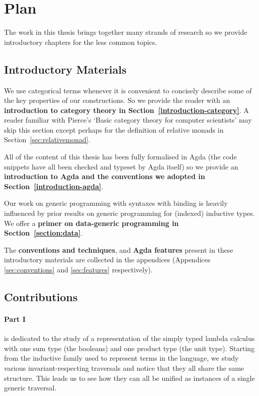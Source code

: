 \section{Plan}

The work in this thesis brings together many strands of research so we provide
introductory chapters for the less common topics.

\subsection{Introductory Materials}

We use categorical terms whenever it is convenient to concisely describe some
of the key properties of our constructions. So we provide the reader with an
\textbf{introduction to category theory in Section~\ref{introduction-category}}.
A reader familiar with Pierce's `Basic category theory for computer scientists'
may skip this section except perhaps for the definition of relative monads
in Section~\ref{sec:relativemonad}.


All of the content of this thesis has been fully formalised in Agda
(the code snippets have all been checked and typeset by Agda itself)
so we provide an \textbf{introduction to Agda and the conventions we
adopted in Section~\ref{introduction-agda}}.

Our work on generic programming with syntaxes with binding is heavily influenced
by prior results on generic programming for (indexed) inductive types. We offer
a \textbf{primer on data-generic programming in Section~\ref{section:data}}.

The \textbf{conventions and techniques}, and \textbf{Agda features} present
in these introductory materials are collected in the appendices
(Appendices \ref{sec:conventions} and \ref{sec:features} respectively).

\subsection{Contributions}

\paragraph{Part I} is dedicated to the study of a \scopeandtypesafe{}
representation of the simply typed lambda calculus with one sum type
(the booleans) and one product type (the unit type).
%
Starting from the inductive family used to represent terms in the language,
we study various invariant-respecting traversals and notice that they all
share the same structure. This leads us to see how they can all be unified
as instances of a single generic traversal.

